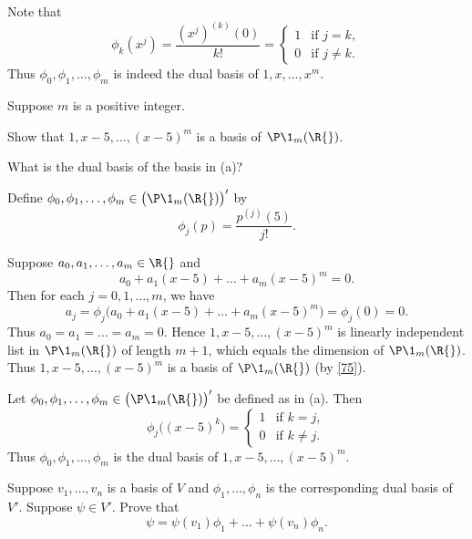 \begin{Solution}
Note that
\[
\phi_k(x^j) = \frac{ (x^j)^{(k)}(0) }{k!}
= \begin{cases} 1 & \text{if\ } j = k, \\
0 & \text{if\ } j \ne k.
\end{cases}
\]
Thus $\phi_0, \phi_1, \dots, \phi_m$ is indeed the dual basis of $1, x, \dots, x^m\!$.
\end{Solution}

\exercise
Suppose $m$ is a positive integer.
\begin{subtheorem}
\item
Show that $1, x-5, \dots, (x-5)^m$ is a basis of $\P\1_m(\R{})$.
\item
What is the dual basis of the basis in (a)?
\end{subtheorem}
\exercisesubtheoremend

\begin{Solution}
\begin{subtheorem}
\item
Define $\phi_0, \phi_1, \dots, \phi_m \in \bigl(\P\1_m(\R{})\bigr)'$ by
\[
\phi_j(p) = \frac{p^{(j)}(5)}{j!}.
\]

Suppose $a_0, a_1, \dots, a_m \in \R{}$ and
\[
a_0 + a_1(x-5) + \dots + a_m(x-5)^m = 0.
\]
Then for each $j = 0, 1, \dots, m$, we have
\[
a_j = \phi_j \bigl( a_0 + a_1(x-5) + \dots + a_m(x-5)^m \bigr) = \phi_j(0) = 0.
\]
Thus $a_0 = a_1 = \dots = a_m = 0$. Hence $1, x-5, \dots, (x-5)^m$ is linearly independent list in $\P\1_m(\R{})$ of length $m + 1$, which equals the dimension of $\P\1_m(\R{})$. Thus
$1, x-5, \dots, (x-5)^m$ is a basis of $\P\1_m(\R{})$ (by \ref{75}).

\item
Let $\phi_0, \phi_1, \dots, \phi_m \in \bigl(\P\1_m(\R{})\bigr)'$ be defined as in (a). Then
\[
\phi_j\bigl( (x-5)^k \bigr) = \begin{cases} 1 & \text{if\ } k = j, \\
0 & \text{if\ } k \ne j.
\end{cases}
\]
Thus $\phi_0, \phi_1, \dots, \phi_m$ is the dual basis of $1, x-5, \dots, (x-5)^m\!$.
\end{subtheorem}
\end{Solution}

\exercise
Suppose $v_1, \dots, v_n$ is a basis of $V$ and $\phi_1, \dots, \phi_n$ is the corresponding dual basis of $V'\!$. Suppose $\psi \in V'\!$. Prove that
\[
\psi = \psi(v_1) \phi_1 + \dots + \psi(v_n) \phi_n.
\]
\exercisedisplayend


